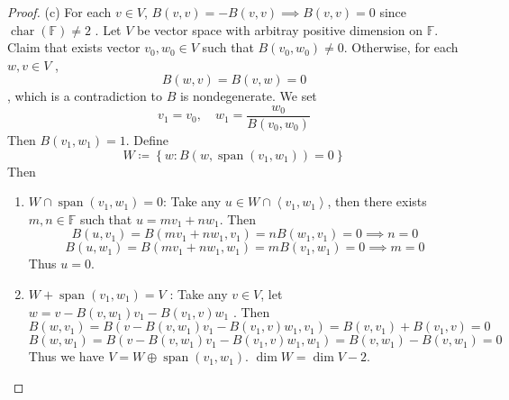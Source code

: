 \documentclass[../main.tex]{subfiles}
\begin{document}
\begin{proof}
     (c) For each \(  v \in V  \), \(  B\left( v,v \right)= -B\left( v,v \right)\implies B\left( v,v \right)= 0     \) since \(  \operatorname{char}\left( \mathbb{F} \right)\neq 2   \) .   Let \(  V  \) be  vector space with arbitray positive dimension on \(  \mathbb{F}  \).  Claim that exists vector \(  v_0,w_0 \in V  \) such that \(  B\left( v_0,w_0 \right) \neq  0   \). Otherwise, for each \(  w,v \in V  \) ,  \[
     B\left( w,v \right)= B\left( v,w \right)= 0  
     \] , which is a contradiction to \(  B  \) is nondegenerate.  We set \[
     v_1= v_0,\quad w_1= \frac{w_0 }{B\left( v_0,w_0 \right)  } 
     \] Then \(  B\left( v_1,w_1 \right)= 1   \). Define \[
     W\coloneqq  \left\{ w: B\left( w, \operatorname{span}\left( v_1,w_1 \right)  \right)= 0  \right\}
     \]Then 
     \begin{enumerate}
          \item \(  W\cap \operatorname{span}\left( v_1,w_1 \right) = 0  \):  Take any \(  u \in W\cap \left<v_1,w_1 \right>  \), then there exists \(  m,n \in \mathbb{F}  \) such that  \(  u= mv_1+ nw_1  \). Then \[
          B\left( u,v_1 \right)= B\left( mv_1+ nw_1,v_1 \right)= nB\left( w_1,v_1 \right)= 0\implies n = 0   
          \]   \[
          B\left( u,w_1 \right)= B\left( mv_1+ nw_1,w_1 \right)= mB\left( v_1,w_1 \right)= 0\implies m= 0   
          \]Thus \(  u= 0  \). 
          \item \(  W+ \operatorname{span}\left( v_1,w_1 \right)= V   \)  : Take any \(  v \in V  \), let \(  w=  v- B\left(v,w_1 \right)v_1-B\left( v_1,v \right)w_1    \)  . Then \[
          B\left( w,v_1 \right)= B\left( v-B\left(v,w_1\right)v_1-B\left( v_1,v \right)w_1 ,v_1  \right)= B\left( v,v_1 \right)+ B\left( v_1,v \right)=    0  
          \] \[
          B\left(w,w_1 \right)= B\left( v-B\left( v,w_1 \right)v_1-B\left( v_1,v \right)w_1,w_1   \right)= B\left( v,w_1 \right)-   B\left(v,w_1 \right)= 0 
          \] Thus we have \(  V= W\oplus \operatorname{span}\left( v_1,w_1 \right)   \). \(  \operatorname{dim}W= \operatorname{dim}V-2  \).  


\end{enumerate}
\end{proof}
\end{document}
